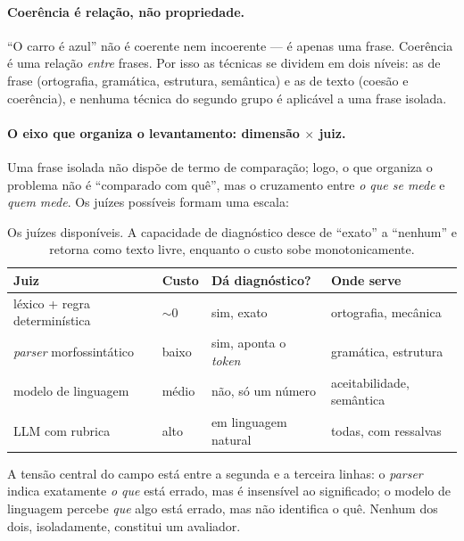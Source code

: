 \documentclass[11pt,a4paper]{article}
\newcommand{\dimtable}[1]{\small #1}
\begin{document}
\paragraph{Coerência é relação, não propriedade.}
``O carro é azul'' não é coerente nem incoerente --- é apenas uma frase. Coerência é uma relação
\emph{entre} frases. Por isso as técnicas se dividem em dois níveis: as de frase (ortografia,
gramática, estrutura, semântica) e as de texto (coesão e coerência), e nenhuma técnica do segundo
grupo é aplicável a uma frase isolada.

\paragraph{O eixo que organiza o levantamento: dimensão $\times$ juiz.}
Uma frase isolada não dispõe de termo de comparação; logo, o que organiza o problema não é
``comparado com quê'', mas o cruzamento entre \emph{o que se mede} e \emph{quem mede}. Os juízes
possíveis formam uma escala:

\begin{table}[H]
\centering
\dimtable{
\begin{tabular}{@{}llll@{}}
\toprule
\textbf{Juiz} & \textbf{Custo} & \textbf{Dá diagnóstico?} & \textbf{Onde serve} \\
\midrule
léxico + regra determinística & $\sim$0        & sim, exato          & ortografia, mecânica \\
\textit{parser} morfossintático & baixo        & sim, aponta o \textit{token} & gramática, estrutura \\
modelo de linguagem           & médio          & não, só um número   & aceitabilidade, semântica \\
LLM com rubrica               & alto           & em linguagem natural & todas, com ressalvas \\
\bottomrule
\end{tabular}}
\caption{Os juízes disponíveis. A capacidade de diagnóstico desce de ``exato'' a ``nenhum'' e
retorna como texto livre, enquanto o custo sobe monotonicamente.}
\label{tab:juizes}
\end{table}

\noindent A tensão central do campo está entre a segunda e a terceira linhas: o \textit{parser}
indica exatamente \emph{o que} está errado, mas é insensível ao significado; o modelo de linguagem
percebe \emph{que} algo está errado, mas não identifica o quê. Nenhum dos dois, isoladamente,
constitui um avaliador.
\end{document}
